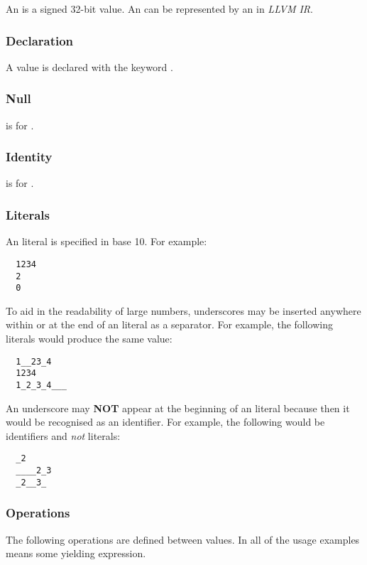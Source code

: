 \documentclass[types.tex]{subfiles}
\begin{document}
An  is a signed 32-bit value. An  can be represented by an  in
\textit{LLVM IR}.

\subsubsection{Declaration}
\label{sssec:integer_decl}
A  value is declared with the keyword .

\subsubsection{Null}
\label{sssec:integer_null}
 is  for .

\subsubsection{Identity}
\label{sssec:integer_ident}
 is  for .

\subsubsection{Literals}
\label{sssec:integer_lit}
An  literal is specified in base 10. For example:
\begin{lstlisting}
  1234
  2
  0
\end{lstlisting}

To aid in the readability of large numbers, underscores may be inserted anywhere within or at the
end of an  literal as a separator. For example, the following literals would produce
the same  value:
\begin{lstlisting}
  1__23_4
  1234
  1_2_3_4___
\end{lstlisting}

An underscore may \textbf{NOT} appear at the beginning of an  literal because then it
would be recognised as an identifier. For example, the following would be identifiers and
\textit{not}  literals:
\begin{lstlisting}
  _2
  ____2_3
  _2__3_
\end{lstlisting}

\subsubsection{Operations}
\label{sssec:integer_ops}
The following operations are defined between  values. In all of the usage examples
 means some  yielding expression.
\end{document}
